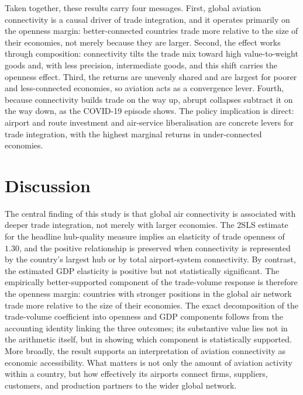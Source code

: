 Taken together, these results carry four messages. First, global aviation
connectivity is a causal driver of trade integration, and it operates primarily on
the openness margin: better-connected countries trade more relative to the size
of their economies, not merely because they are larger. Second, the effect works
through composition: connectivity tilts the trade mix toward high value-to-weight
goods and, with less precision, intermediate goods, and this shift carries the
openness effect. Third, the
returns are unevenly shared and are largest for poorer and less-connected
economies, so aviation acts as a convergence lever. Fourth, because connectivity builds trade on
the way up, abrupt collapses subtract it on the way down, as the COVID-19 episode
shows. The policy implication is direct: airport and route investment and
air-service liberalisation are concrete levers for trade integration, with the
highest marginal returns in under-connected economies.

\section{Discussion}
\label{sec:discussion}
The central finding of this study is that global air connectivity is
associated with deeper trade integration, not merely with larger economies.
The 2SLS estimate for the headline hub-quality measure implies an elasticity
of trade openness of $1.30$, and the positive relationship is preserved when
connectivity is represented by the country's largest hub or by total
airport-system connectivity. By contrast, the estimated GDP elasticity is
positive but not statistically significant. The empirically better-supported
component of the trade-volume response is therefore the openness margin:
countries with stronger positions in the global air network trade more
relative to the size of their economies. The exact decomposition of the
trade-volume coefficient into openness and GDP components follows from the
accounting identity linking the three outcomes; its substantive value lies
not in the arithmetic itself, but in showing which component is statistically
supported. More broadly, the result supports an interpretation of aviation
connectivity as economic accessibility. What matters is not only the amount
of aviation activity within a country, but how effectively its airports
connect firms, suppliers, customers, and production partners to the wider
global network.

